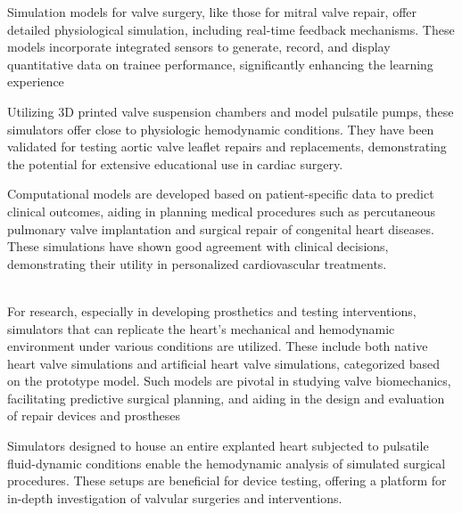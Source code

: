 Simulation models for valve surgery, like those for mitral valve repair, offer detailed physiological simulation, including real-time feedback mechanisms. These models incorporate integrated sensors to generate, record, and display quantitative data on trainee performance, significantly enhancing the learning experience ~

Utilizing 3D printed valve suspension chambers and model pulsatile pumps, these simulators offer close to physiologic hemodynamic conditions. They have been validated for testing aortic valve leaflet repairs and replacements, demonstrating the potential for extensive educational use in cardiac surgery. ~

Computational models are developed based on patient-specific data to predict clinical outcomes, aiding in planning medical procedures such as percutaneous pulmonary valve implantation and surgical repair of congenital heart diseases. These simulations have shown good agreement with clinical decisions, demonstrating their utility in personalized cardiovascular treatments. ~

\\
For research, especially in developing prosthetics and testing interventions, simulators that can replicate the heart's mechanical and hemodynamic environment under various conditions are utilized. These include both native heart valve simulations and artificial heart valve simulations, categorized based on the prototype model. Such models are pivotal in studying valve biomechanics, facilitating predictive surgical planning, and aiding in the design and evaluation of repair devices and prostheses ~

Simulators designed to house an entire explanted heart subjected to pulsatile fluid-dynamic conditions enable the hemodynamic analysis of simulated surgical procedures. These setups are beneficial for device testing, offering a platform for in-depth investigation of valvular surgeries and interventions. ~


